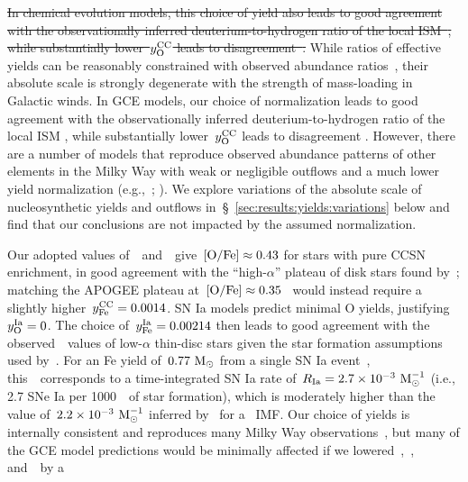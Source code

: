 \documentclass[ms.tex]{subfiles}
\begin{document}
{\color{red}
\sout{In chemical evolution models, this choice of yield also leads to good
agreement with the observationally inferred deuterium-to-hydrogen ratio of the
local ISM~\mbox{\citep{Linsky2006}}, while substantially lower~$y_\text{O}^\text{CC}$ leads
to disagreement~\mbox{\citep{Weinberg2017b}}.}
While ratios of effective yields can be reasonably constrained with observed
abundance ratios~\citep[e.g.,][]{Weinberg2019, Weinberg2022, Griffith2021,
Griffith2022}, their absolute scale is strongly degenerate with the strength of
mass-loading in Galactic winds.
In GCE models, our choice of normalization leads to good agreement with the
observationally inferred deuterium-to-hydrogen ratio of the local ISM
\citep{Linsky2006}, while substantially lower~$y_\text{O}^\text{CC}$ leads to disagreement
\citep{Weinberg2017b}.
However, there are a number of models that reproduce observed abundance
patterns of other elements in the Milky Way with weak or negligible outflows
and a much lower yield normalization (e.g.,~\citealp*{Kubryk2015};
\citealp{Prantzos2018, Spitoni2019, Spitoni2021}).
We explore variations of the absolute scale of nucleosynthetic yields and
outflows in~\S~\ref{sec:results:yields:variations} below and find that our
conclusions are not impacted by the assumed normalization.
}
\par
Our adopted values of~~and~~give~$\text{[O/Fe]}\approx0.43$ for stars
with pure CCSN enrichment, in good agreement with the ``high-$\alpha$'' plateau
of disk stars found by~\citet{Ramirez2013}; matching the APOGEE plateau
at~$\text{[O/Fe]}\approx0.35$~\citep[see, e.g., fig.~6 of][]{Hasselquist2021} would
instead require a slightly higher~$y_\text{Fe}^\text{CC} = 0.0014$.
SN Ia models predict minimal O yields, justifying~$y_\text{O}^\text{Ia} = 0$.
The choice of~$y_\text{Fe}^\text{Ia} = 0.00214$ then leads to good agreement with the
observed~\ofe~values of low-$\alpha$ thin-disc stars given the star formation
assumptions used by~\citet[][for analytic discussion, see~\S~3.1
of~\citealp*{Weinberg2017}]{Johnson2021}.
For an Fe yield of~$0.77~\text{M}_\odot$ from a single SN Ia event~\citep{Iwamoto1999},
this~~corresponds to a time-integrated SN Ia rate
of~$R_\text{Ia} = 2.7\times10^{-3}~\text{M}_\odot^{-1}$ (i.e., 2.7 SNe Ia per
1000~\msun~of star formation), which is moderately higher than the value
of~$2.2\times10^{-3}~\text{M}_\odot^{-1}$ inferred by~\citet{Maoz2012} for
a~\citet{Kroupa2001} IMF.
Our choice of yields is internally consistent and reproduces many Milky Way
observations~\citep{Johnson2021}, but many of the GCE model predictions would
be minimally affected if we lowered~,~, and~~by a
\end{document}
